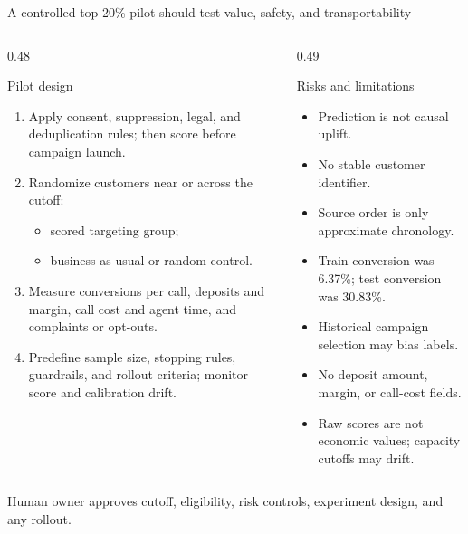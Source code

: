 \documentclass[aspectratio=169,11pt]{beamer}
\newcommand{\tightitem}{\setlength\itemsep{0.25em}}
\begin{document}
\begin{frame}{A controlled top-20\% pilot should test value, safety, and transportability}
\begin{columns}[T,totalwidth=\textwidth]
\begin{column}{0.48\textwidth}
\begin{block}{Pilot design}
\begin{enumerate}\tightitem
  \item Apply consent, suppression, legal, and deduplication rules; then score before campaign launch.
  \item Randomize customers near or across the cutoff:
    \begin{itemize}\tightitem
      \item scored targeting group;
      \item business-as-usual or random control.
    \end{itemize}
  \item Measure conversions per call, deposits and margin, call cost and agent time, and complaints or opt-outs.
  \item Predefine sample size, stopping rules, guardrails, and rollout criteria; monitor score and calibration drift.
\end{enumerate}
\end{block}
\end{column}
\begin{column}{0.49\textwidth}
\begin{block}{Risks and limitations}
\begin{itemize}\tightitem
  \item Prediction is not causal uplift.
  \item No stable customer identifier.
  \item Source order is only approximate chronology.
  \item Train conversion was 6.37\%; test conversion was 30.83\%.
  \item Historical campaign selection may bias labels.
  \item No deposit amount, margin, or call-cost fields.
  \item Raw scores are not economic values; capacity cutoffs may drift.
\end{itemize}
\end{block}
\end{column}
\end{columns}
\vspace{0.5em}
\centering\small Human owner approves cutoff, eligibility, risk controls, experiment design, and any rollout.
\end{frame}
\end{document}
